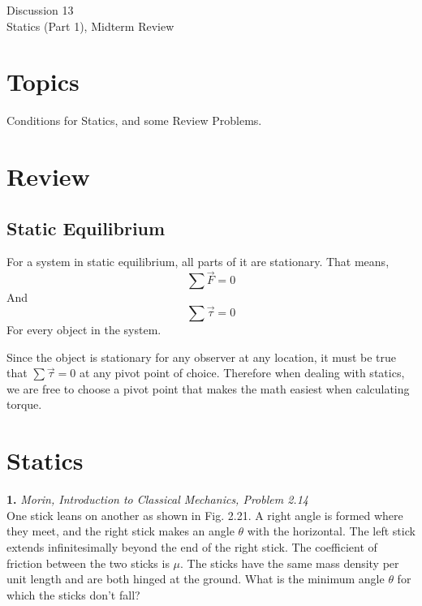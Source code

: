 \documentclass[11pt]{article}
\theoremstyle{gangnamstyle}{\newtheorem{definition}{Definition}[]}
\theoremstyle{gangnamstyle}{\newtheorem{example}{Example}[]}
\theoremstyle{gangnamstyle}{\newtheorem{problem}{Problem}[]}
\begin{document}
\normalfont
\pagestyle{pages}


\begin{center}
\vspace{3in}
{\Large Discussion 13 } \\ [0.05in]
Statics (Part 1), Midterm Review \\ [-0.5in]
\end{center}

\section*{Topics}
Conditions for Statics, and some Review Problems. 

\section{Review}

\subsection{Static Equilibrium}

For a system in static equilibrium, all parts of it are stationary. That means, 
\[ \sum \Vec{F} = 0 \]
And
\[ \sum \Vec{\tau} = 0 \]
For every object in the system. 

Since the object is stationary for any observer at any location, it must be true that $\sum \Vec{\tau} = 0$ at any pivot point of choice. Therefore when dealing with statics, we are free to choose a pivot point that makes the math easiest when calculating torque. 

\pagebreak

\section{Statics}

\textbf{1.} \textit{Morin, Introduction to Classical Mechanics, Problem 2.14} \\
One stick leans on another as shown in Fig. 2.21. A right angle is formed where they meet, and the right stick makes an angle $\theta$ with the horizontal. The left stick extends infinitesimally beyond the end of the right stick. The coefficient of friction between the two sticks is $\mu$. The sticks have the same mass density per unit length and are both hinged at the ground. What is the minimum angle $\theta$ for which the sticks don’t fall?
\end{document}
